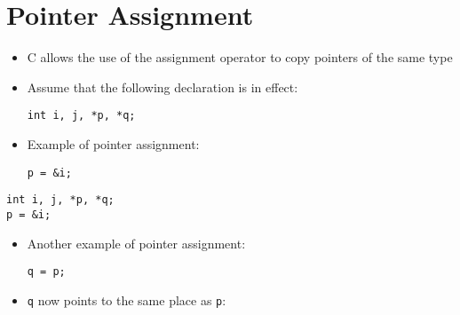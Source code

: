 \documentclass{article}
\begin{document}
\section{Pointer Assignment}
\begin{itemize}
\item C allows the use of the assignment operator to copy pointers of the same type

\item Assume that the following declaration is in effect:
\begin{verbatim}
int i, j, *p, *q;
\end{verbatim}

\item Example of pointer assignment:
\begin{verbatim}
p = &i;
\end{verbatim}
\end{itemize}

\begin{verbatim}
int i, j, *p, *q;
p = &i;
\end{verbatim}
\begin{itemize}
\item Another example of pointer assignment:
\begin{verbatim}
q = p;
\end{verbatim}
\item \verb!q! now points to the same place as \verb!p!:

\begin{center}
\end{center}

\end{itemize}
\end{document}
